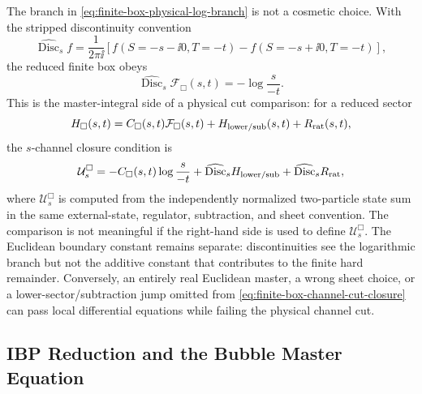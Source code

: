 \begin{controlledapproximation}
\label{ca:finite-box-channel-discontinuity-closure}
The branch in \eqref{eq:finite-box-physical-log-branch} is not a cosmetic
choice.  With the stripped discontinuity convention
\[
  \widehat{\operatorname{Disc}}_s f
  =
  \frac{1}{2\pi\ii}
  \left[
    f(S=-s-\ii0,T=-t)-f(S=-s+\ii0,T=-t)
  \right],
\]
the reduced finite box obeys
\begin{equation}
  \widehat{\operatorname{Disc}}_s
  \mathcal F_{\Box}(s,t)
  =
  -\log\frac{s}{-t}.
  \label{eq:finite-box-channel-discontinuity}
\end{equation}
This is the master-integral side of a physical cut comparison: for a reduced
sector
\[
  H_{\Box}(s,t)
  =
  C_{\Box}(s,t)\mathcal F_{\Box}(s,t)
  +H_{\rm lower/sub}(s,t)
  +R_{\rm rat}(s,t),
\]
the \(s\)-channel closure condition is
\begin{equation}
  \mathcal U_s^{\Box}
  =
  -C_{\Box}(s,t)\log\frac{s}{-t}
  +
  \widehat{\operatorname{Disc}}_s H_{\rm lower/sub}
  +
  \widehat{\operatorname{Disc}}_s R_{\rm rat},
  \label{eq:finite-box-channel-cut-closure}
\end{equation}
where \(\mathcal U_s^{\Box}\) is computed from the independently normalized
two-particle state sum in the same external-state, regulator, subtraction,
and sheet convention.  The comparison is not meaningful if the right-hand
side is used to define \(\mathcal U_s^{\Box}\).  The Euclidean boundary
constant remains separate: discontinuities see the logarithmic branch but
not the additive constant that contributes to the finite hard remainder.
Conversely, an entirely real Euclidean master, a wrong sheet choice, or a
lower-sector/subtraction jump omitted from
\eqref{eq:finite-box-channel-cut-closure} can pass local differential
equations while failing the physical channel cut.
\end{controlledapproximation}

\subsection{IBP Reduction and the Bubble Master Equation}
\label{subsec:ibp-bubble-master-equation}

